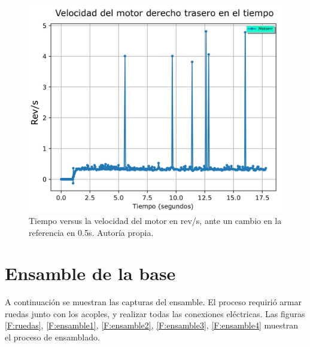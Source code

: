 \begin{figure}[H]
\centering
\includegraphics[scale=0.3]{imagenes/velocidadpidmotorrr.png}
\caption{Tiempo versus la velocidad del motor en rev/s, ante un cambio en la referencia en 0.5s. Autoría propia.}
\label{F:pidvelocidad}
\end{figure}

\newpage

\section{Ensamble de la base}

A continuación se muestran las capturas del ensamble. El proceso requirió armar ruedas junto con los acoples, y realizar todas las conexiones eléctricas. Las figuras \ref{F:ruedas}, \ref{F:ensamble1}, \ref{F:ensamble2}, \ref{F:ensamble3}, \ref{F:ensamble4} muestran el proceso de ensamblado.


